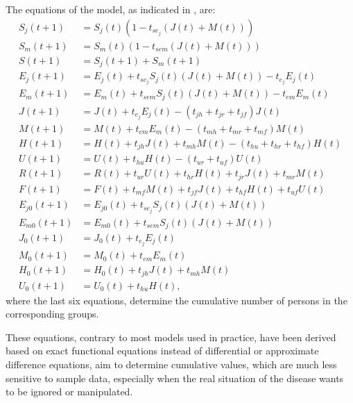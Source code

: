 The equations of the model, as indicated in \cite{Castillo2020Covid}, are:
\begin{align}
S_j(t+1) &= S_j(t)(1-t_{se_j}(J(t) + M(t))) \label{eq:covid1}\\
S_m(t+1) &= S_m(t)(1-t_{sem}(J(t) + M(t))) \label{eq:covid2}\\
S(t+1) &= S_j(t+1) + S_m(t+1) \label{eq:covid3}\\
E_j(t+1) &= E_j(t) + t_{se_j}S_j(t)(J(t) + M(t)) - t_{e_j}E_j(t) \label{eq:covid4}\\
E_m(t+1) &= E_m(t) + t_{sem}S_j(t)(J(t) + M(t)) - t_{em}E_m(t) \label{eq:covid5}\\
J(t+1) &= J(t) + t_{e_j}E_j(t) - (t_{jh} + t_{jr} + t_{jf})J(t) \label{eq:covid6}\\
M(t+1) &= M(t) + t_{em}E_m(t) - (t_{mh} + t_{mr} + t_{mf})M(t) \label{eq:covid7}\\
H(t+1) &= H(t) + t_{jh}J(t) + t_{mh}M(t) - (t_{hu} + t_{hr} + t_{hf})H(t) \label{eq:covid8}\\
U(t+1) &= U(t) + t_{hu}H(t) - (t_{ur} + t_{uf})U(t) \label{eq:covid9}\\
R(t+1) &= R(t) + t_{ur}U(t) + t_{hr}H(t) + t_{jr}J(t) + t_{mr}M(t) \label{eq:covid10}\\
F(t+1) &= F(t) + t_{mf}M(t) + t_{jf}J(t) + t_{hf}H(t) + t_{uf}U(t) \label{eq:covid11}\\
E_{j0}(t+1) &= E_{j0}(t) + t_{se_j}S_j(t)(J(t) + M(t)) \label{eq:covid12}\\
E_{m0}(t+1) &= E_{m0}(t) + t_{sem}S_j(t)(J(t) + M(t)) \label{eq:covid13}\\
J_0(t+1) &= J_0(t) + t_{e_j}E_j(t) \label{eq:covid14}\\
M_0(t+1) &= M_0(t) + t_{em}E_m(t) \label{eq:covid15}\\
H_0(t+1) &= H_0(t) + t_{jh}J(t) + t_{mh}M(t) \label{eq:covid16}\\
U_0(t+1) &= U_0(t) + t_{hu}H(t), \label{eq:covid17}
\end{align}
where the last six equations, determine the cumulative number of persons in the corresponding groups.

These equations, contrary to most models used in practice, have been derived based on exact functional equations instead of differential or approximate difference equations, aim to determine cumulative values, which are much less sensitive to sample data, especially when the real situation of the disease wants to be ignored or manipulated.

